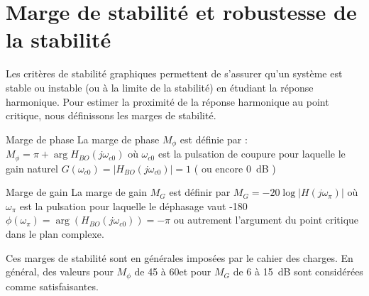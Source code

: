\section{Marge de stabilité et robustesse de la stabilité}
Les critères de stabilité graphiques permettent de s'assurer qu'un système 
est stable ou instable (ou à la limite de la stabilité) en étudiant la réponse
harmonique. Pour estimer la proximité de la réponse harmonique au point 
critique, nous définissons les marges de stabilité. 
\begin{bdefinition}{Marge de phase}
La marge de phase $M_{\phi}$ est définie par :
$M_\phi=\pi+\arg{H_{BO}(j\omega_{c0})}$ où $\omega_{c0}$ est la pulsation de 
coupure pour laquelle le gain naturel $G(\omega_{c0})=|H_{BO}(j\omega_{c0})|=1$
( ou encore 0~\si{\dB} ) 
\end{bdefinition}
\begin{bdefinition}{Marge de gain}
La marge de gain $M_G$ est définir par $M_G=-20\log{|H(j\omega_\pi)|}$ où 
$\omega_{\pi}$ est la pulsation pour laquelle le déphasage vaut 
-180\degreeSI $\phi(\omega_\pi)=\arg{(H_{BO}(j\omega_{c0}))}=-\pi$
ou autrement l'argument du point critique dans le plan complexe.
\end{bdefinition}
Ces marges de stabilité sont en générales imposées par le cahier des charges.
En général, des valeurs pour $M_{\phi}$ de 45 à 60\degreeSI et
pour $M_G$ de 6 à 15~\si{\dB} sont considérées comme satisfaisantes.

